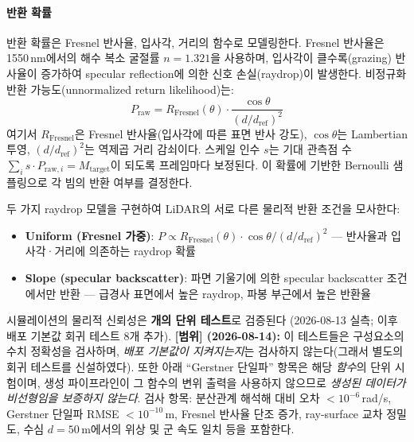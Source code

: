 \documentclass[11pt]{report}
\numberwithin{equation}{chapter}
\numberwithin{figure}{chapter}
\numberwithin{table}{chapter}
\begin{document}
\paragraph{반환 확률}
반환 확률은 Fresnel 반사율, 입사각, 거리의 함수로 모델링한다.
Fresnel 반사율은 1550\,nm에서의 해수 복소 굴절률 $n = 1.321$을 사용하며,
입사각이 클수록(grazing) 반사율이 증가하여 specular reflection에 의한
신호 손실(raydrop)이 발생한다.
비정규화 반환 가능도(unnormalized return likelihood)는:
\begin{equation}
  P_{\text{raw}} = R_{\text{Fresnel}}(\theta) \cdot \frac{\cos\theta}{(d/d_{\text{ref}})^2}
  \label{eq:return_prob}
\end{equation}
여기서 $R_{\text{Fresnel}}$은 Fresnel 반사율(입사각에 따른 표면 반사 강도),
$\cos\theta$는 Lambertian 투영, $(d/d_{\text{ref}})^2$는 역제곱 거리 감쇠이다.
스케일 인수 $s$는 기대 관측점 수 $\sum_i s \cdot P_{\text{raw},i} = M_{\text{target}}$이
되도록 프레임마다 보정된다.
이 확률에 기반한 Bernoulli 샘플링으로 각 빔의 반환 여부를 결정한다.

두 가지 raydrop 모델을 구현하여 LiDAR의 서로 다른 물리적 반환 조건을 모사한다:
\begin{itemize}
  \item \textbf{Uniform (Fresnel 가중)}: $P \propto R_\text{Fresnel}(\theta) \cdot \cos\theta / (d/d_\text{ref})^2$
        --- 반사율과 입사각·거리에 의존하는 raydrop 확률
  \item \textbf{Slope (specular backscatter)}: 파면 기울기에 의한 specular backscatter 조건에서만 반환
        --- 급경사 표면에서 높은 raydrop, 파봉 부근에서 높은 반환율
\end{itemize}

시뮬레이션의 물리적 신뢰성은 \textbf{\DeployNumTests 개의 단위 테스트}로 검증된다
(2026-08-13 실측; 이후 배포 기본값 회귀 테스트 8개 추가).
\textbf{[범위] (2026-08-14):} 이 테스트들은 구성요소의 수치 정확성을 검사하며,
\emph{배포 기본값이 지켜지는지}는 검사하지 않는다(그래서 별도의 회귀 테스트를 신설하였다).
또한 아래 ``Gerstner 단일파'' 항목은 해당 \emph{함수}의 단위 시험이며,
생성 파이프라인이 그 함수의 변위 출력을 사용하지 않으므로
\emph{생성된 데이터가 비선형임을 보증하지 않는다}.
검사 항목:
분산관계 해석해 대비 오차 $< 10^{-6}$\,rad/s,
Gerstner 단일파 RMSE $< 10^{-10}$\,m,
Fresnel 반사율 단조 증가, ray-surface 교차 정밀도, 수심 $d=50$\,m에서의
위상 및 군 속도 일치 등을 포함한다.
\end{document}
